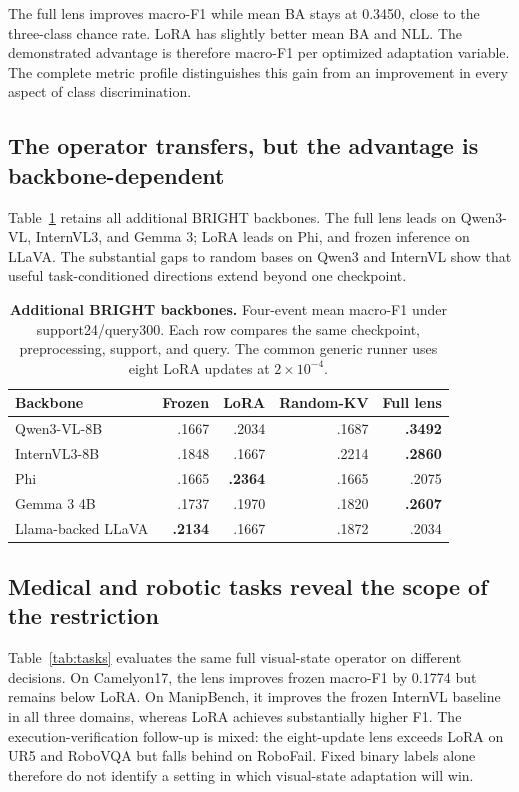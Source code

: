 \documentclass{article}
\begin{document}
The full lens improves macro-F1 while mean BA stays at 0.3450, close to the three-class chance rate. LoRA has slightly better mean BA and NLL. The demonstrated advantage is therefore macro-F1 per optimized adaptation variable. The complete metric profile distinguishes this gain from an improvement in every aspect of class discrimination.

\subsection{The operator transfers, but the advantage is backbone-dependent}
Table~\ref{tab:backbones} retains all additional BRIGHT backbones. The full lens leads on Qwen3-VL, InternVL3, and Gemma 3; LoRA leads on Phi, and frozen inference on LLaVA. The substantial gaps to random bases on Qwen3 and InternVL show that useful task-conditioned directions extend beyond one checkpoint.

\begin{table}[t]
\caption{\textbf{Additional BRIGHT backbones.} Four-event mean macro-F1 under support24/query300. Each row compares the same checkpoint, preprocessing, support, and query. The common generic runner uses eight LoRA updates at $2\times10^{-4}$.}
\label{tab:backbones}
\centering\small
\begin{tabular}{@{}lrrrr@{}}
\toprule
Backbone & Frozen & LoRA & Random-KV & Full lens\\
\midrule
Qwen3-VL-8B & .1667 & .2034 & .1687 & \textbf{.3492}\\
InternVL3-8B & .1848 & .1667 & .2214 & \textbf{.2860}\\
Phi & .1665 & \textbf{.2364} & .1665 & .2075\\
Gemma 3 4B & .1737 & .1970 & .1820 & \textbf{.2607}\\
Llama-backed LLaVA & \textbf{.2134} & .1667 & .1872 & .2034\\
\bottomrule
\end{tabular}
\end{table}

\subsection{Medical and robotic tasks reveal the scope of the restriction}
Table~\ref{tab:tasks} evaluates the same full visual-state operator on different decisions. On Camelyon17, the lens improves frozen macro-F1 by 0.1774 but remains below LoRA. On ManipBench, it improves the frozen InternVL baseline in all three domains, whereas LoRA achieves substantially higher F1. The execution-verification follow-up is mixed: the eight-update lens exceeds LoRA on UR5 and RoboVQA but falls behind on RoboFail. Fixed binary labels alone therefore do not identify a setting in which visual-state adaptation will win.
\end{document}
